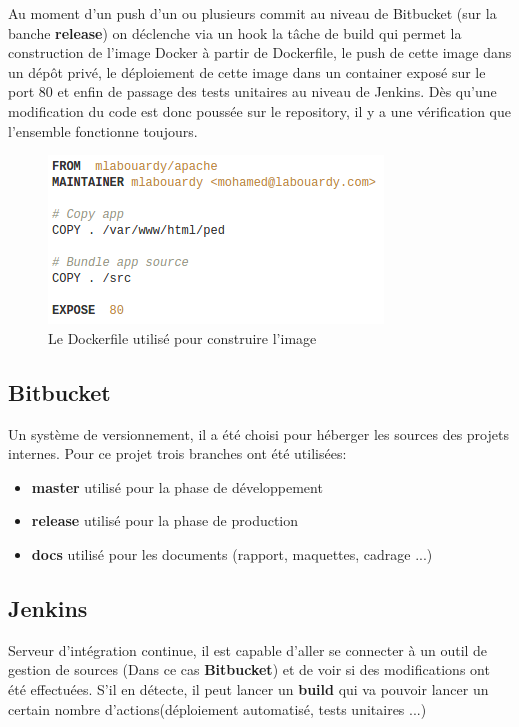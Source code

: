 \documentclass [a4paper,11pt]{article}
\begin{document}
Au moment d’un push d’un ou plusieurs commit au niveau de Bitbucket (sur la banche \textbf{release}) on déclenche via un hook la tâche de build qui permet la construction de l'image Docker à partir de Dockerfile, le push de cette image dans un dépôt privé, le déploiement de cette image dans un container exposé sur le port 80 et enfin de passage des tests unitaires au niveau de Jenkins. Dès qu’une modification du code est donc poussée sur le repository, il y a une vérification que l’ensemble fonctionne toujours.

\begin{figure}[!h]
\centering
\includegraphics[scale=0.7]{img/Dockerfile.png}
\caption{Le Dockerfile utilisé pour construire l'image}
\end{figure}

\subsection{Bitbucket}

Un système de versionnement, il a été choisi pour héberger les sources des projets internes.\cite{BITBUCKET} Pour ce projet trois branches ont été utilisées:\newline

\begin{itemize}
 \item \textbf{master} utilisé pour la phase de développement
 \item \textbf{release} utilisé pour la phase de production
 \item \textbf{docs} utilisé pour les documents (rapport, maquettes, cadrage ...)
\end{itemize}

\subsection{Jenkins}

Serveur d'intégration continue, il est capable d’aller se connecter à un outil de gestion de sources (Dans ce cas \textbf{Bitbucket}) et de voir si des modifications ont été effectuées. S’il en détecte, il peut lancer un \textbf{build} qui va pouvoir lancer un certain nombre d’actions(déploiement automatisé, tests unitaires ...)
\end{document}
